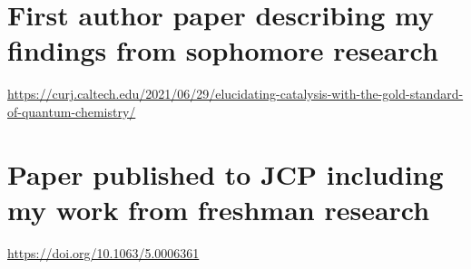 \documentclass{article}
\begin{document}
\section{First author paper describing my findings from sophomore research}
\url{https://curj.caltech.edu/2021/06/29/elucidating-catalysis-with-the-gold-standard-of-quantum-chemistry/}
\section{Paper published to JCP including my work from freshman research}
\url{https://doi.org/10.1063/5.0006361}
\end{document}
